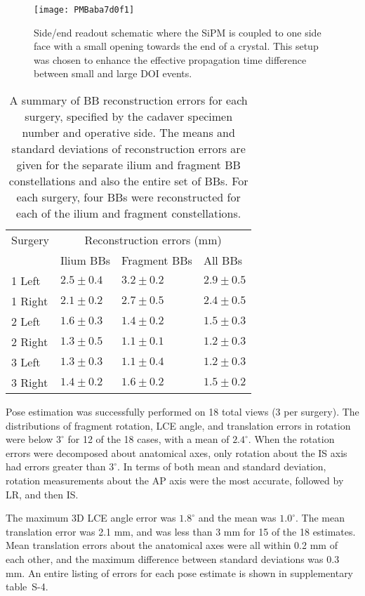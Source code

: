 \documentclass[demo]{OUP-EJ}
\begin{document}
\begin{figure}[!t]
\centering
 \texttt{[image: PMBaba7d0f1]}
 \caption{Side/end readout schematic where the SiPM is coupled to one side face with a small opening towards the end of a crystal. This setup was chosen to enhance the effective propagation time difference between small and large DOI events.}
 \label{fig:detector}
\end{figure}


\begin{table}[!t]
\centering\caption{A summary of BB reconstruction errors for each surgery, specified by the cadaver specimen number and operative side.
The means and standard deviations of reconstruction errors are given for the separate ilium and fragment BB constellations and also the entire set of BBs.
For each surgery, four BBs were reconstructed for each of the ilium and fragment constellations.}
\label{tab:results_bb_recon_errors}
\begin{tabular*}{\textwidth}{@{\extracolsep\fill}l l l l}
\hline
Surgery & \multicolumn{3}{c}{Reconstruction errors (mm)} \\
\cline{2-4}
& Ilium BBs & Fragment BBs & All BBs \\
\hline
1 Left & $2.5 \pm        0.4$ & $3.2 \pm        0.2$ &  $2.9 \pm        0.5$ \\
1 Right & $2.1 \pm      0.2$ &  $2.7 \pm        0.5$ &  $2.4 \pm        0.5$ \\
2 Left & $1.6 \pm       0.3$ &  $1.4 \pm        0.2$ &  $1.5 \pm        0.3$ \\
2 Right & $1.3 \pm      0.5$ &  $1.1 \pm        0.1$ &  $1.2 \pm        0.3$ \\
3 Left & $1.3 \pm       0.3$ &  $1.1 \pm        0.4$ &  $1.2 \pm        0.3$ \\
3 Right & $1.4 \pm      0.2$ &  $1.6 \pm        0.2$ &  $1.5 \pm        0.2$ \\
\hline
\end{tabular*}
\end{table}


\begin{theorem}
Pose estimation was successfully performed on 18 total views (3 per surgery).
The distributions of fragment rotation, LCE angle, and translation errors in rotation were below $3^{\circ}$ for 12 of the 18 cases, with a mean of $2.4^{\circ}$.
When the rotation errors were decomposed about anatomical axes, only rotation about the IS axis had errors greater than $3^{\circ}$.
In terms of both mean and standard deviation, rotation measurements about the AP axis were the most accurate, followed by LR, and then IS.
\end{theorem}
\begin{theorem}
The maximum 3D LCE angle error was $1.8^{\circ}$ and the mean was $1.0^{\circ}$.
The mean translation error was 2.1 mm, and was less than 3 mm for 15 of the 18 estimates.
Mean translation errors about the anatomical axes were all within 0.2 mm of each other, and the maximum difference between standard deviations was 0.3 mm.
An entire listing of errors for each pose estimate is shown in supplementary table~S-4.
\end{theorem}
\end{document}
